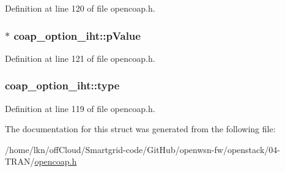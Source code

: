 Definition at line 120 of file opencoap.\+h.

\subsubsection[{\texorpdfstring{p\+Value}{pValue}}]{$\ast$ coap\+\_\+option\+\_\+iht\+::p\+Value}\hypertarget{structcoap__option__iht_a6ae9caef21a61bb806682d0fc45df665}{}\label{structcoap__option__iht_a6ae9caef21a61bb806682d0fc45df665}


Definition at line 121 of file opencoap.\+h.

\subsubsection[{\texorpdfstring{type}{type}}]{ coap\+\_\+option\+\_\+iht\+::type}\hypertarget{structcoap__option__iht_af24849eefc846d0dba40fc0f12e1d1a9}{}\label{structcoap__option__iht_af24849eefc846d0dba40fc0f12e1d1a9}


Definition at line 119 of file opencoap.\+h.



The documentation for this struct was generated from the following file\+:\begin{DoxyCompactItemize}
\item 
/home/lkn/off\+Cloud/\+Smartgrid-\/code/\+Git\+Hub/openwsn-\/fw/openstack/04-\/\+T\+R\+A\+N/\hyperlink{opencoap_8h}{opencoap.\+h}\end{DoxyCompactItemize}
